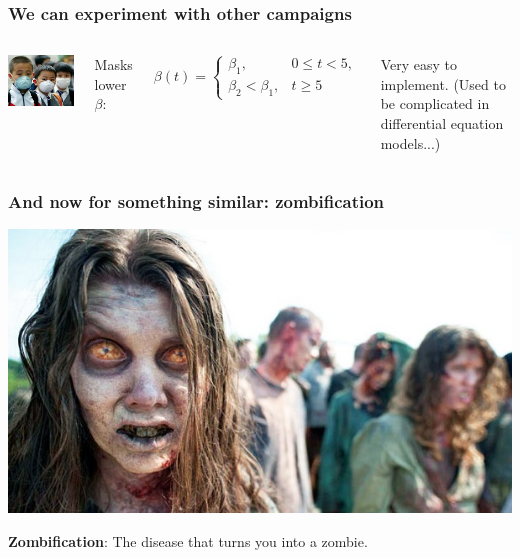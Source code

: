 \documentclass{beamer}
\begin{document}
\begin{frame}
\frametitle{We can experiment with other campaigns}

\begin{columns}
\begin{center}  %
  \centerline{\includegraphics[width=0.9\linewidth]{fig/disease2.jpg}}
\end{center}


Masks lower $\beta$:

\begin{equation*} \beta(t) = \left\lbrace\begin{array}{ll}
\beta_1,& 0\leq t < 5,\\
\beta_2 < \beta_1,& t \geq 5\end{array}\right.
\end{equation*}

Very easy to implement. (Used to be complicated in differential
equation models...)

\end{columns}
\end{frame}

\begin{frame}
\frametitle{And now for something similar: zombification}

\begin{center}  %
  \centerline{\includegraphics[width=0.9\linewidth]{fig/zombie1.jpg}}
\end{center}


\textbf{Zombification}: The disease that turns you into a zombie.
\end{frame}
\end{document}

